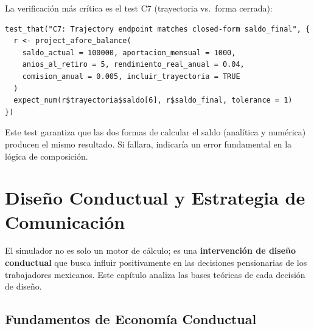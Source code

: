 \documentclass[11pt,a4paper]{report}
\begin{document}
\begin{tcolorbox}[colback=orange!5!white, colframe=orange!75!black, title=\textbf{Aplicaci\'on en C\'odigo}]
La verificaci\'on m\'as cr\'itica es el test C7 (trayectoria vs.\ forma cerrada):

\begin{lstlisting}
test_that("C7: Trajectory endpoint matches closed-form saldo_final", {
  r <- project_afore_balance(
    saldo_actual = 100000, aportacion_mensual = 1000,
    anios_al_retiro = 5, rendimiento_real_anual = 0.04,
    comision_anual = 0.005, incluir_trayectoria = TRUE
  )
  expect_num(r$trayectoria$saldo[6], r$saldo_final, tolerance = 1)
})
\end{lstlisting}

Este test garantiza que las dos formas de calcular el saldo (anal\'itica y num\'erica) producen el mismo resultado. Si fallara, indicar\'ia un error fundamental en la l\'ogica de composici\'on.
\end{tcolorbox}



\chapter{Dise\~no Conductual y Estrategia de Comunicaci\'on}

El simulador no es solo un motor de c\'alculo; es una \textbf{intervenci\'on de dise\~no conductual} que busca influir positivamente en las decisiones pensionarias de los trabajadores mexicanos. Este cap\'itulo analiza las bases te\'oricas de cada decisi\'on de dise\~no.

\section{Fundamentos de Econom\'ia Conductual}
\end{document}
